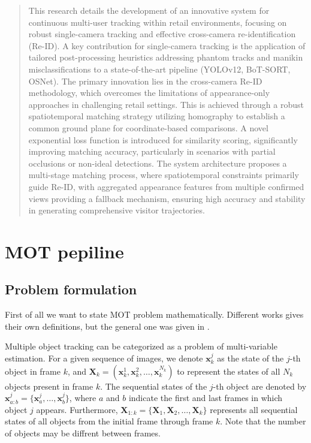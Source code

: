 \documentclass[12pt, a4paper]{article}
\begin{document}
\makeTitlePage

\begin{abstract}
This research details the development of an innovative system for continuous multi-user tracking within retail environments, focusing on robust single-camera tracking and effective cross-camera re-identification (Re-ID). A key contribution for single-camera tracking is the application of tailored post-processing heuristics addressing phantom tracks and manikin misclassifications to a state-of-the-art pipeline (YOLOv12, BoT-SORT, OSNet). The primary innovation lies in the cross-camera Re-ID methodology, which overcomes the limitations of appearance-only approaches in challenging retail settings. This is achieved through a robust spatiotemporal matching strategy utilizing homography to establish a common ground plane for coordinate-based comparisons. A novel exponential loss function is introduced for similarity scoring, significantly improving matching accuracy, particularly in scenarios with partial occlusions or non-ideal detections. The system architecture proposes a multi-stage matching process, where spatiotemporal constraints primarily guide Re-ID, with aggregated appearance features from multiple confirmed views providing a fallback mechanism, ensuring high accuracy and stability in generating comprehensive visitor trajectories.
\end{abstract}

\tableofcontents

\section{MOT pepiline}
\subsection{Problem formulation}

First of all we want to state MOT problem mathematically. Different works gives their own definitions, but the general one was given in \cite{lit-review}.

Multiple object tracking can be categorized as a problem of multi-variable estimation. For a given sequence of images, 
we denote $\mathbf{x}_k^j$ as the state of the $j$-th object in frame $k$, and 
$\mathbf{X}_k = (\mathbf{x}_k^1, \mathbf{x}_k^2, \ldots, \mathbf{x}_k^{N_k})$ to represent the states of all $N_k$ 
objects present in frame $k$. The sequential states of the $j$-th object are denoted by 
$\mathbf{x}_{a:b}^j = \{\mathbf{x}_{a}^j, \ldots, \mathbf{x}_{b}^j\}$, where $a$ and $b$ 
indicate the first and last frames in which object $j$ appears. Furthermore, $\mathbf{X}_{1:k} = \{\mathbf{X}_1, \mathbf{X}_2, \ldots, \mathbf{X}_k\}$ 
represents all sequential states of all objects from the initial frame through frame $k$. Note that the number of objects may be diffrent between frames.
\end{document}
